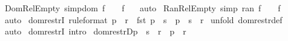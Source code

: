 \begin{isabellebody}
\isamarkupfalse%
%
\endisatagproof
{\isafoldproof}%
%
\isadelimproof
\isanewline
%
\endisadelimproof
\isanewline
\isanewline
\isanewline
{}\isamarkupfalse%
\ Dom{\isacharunderscore}Rel{\isacharunderscore}Empty\ {\isacharbrackleft}simp{\isacharbrackright}{\isacharcolon}{\isachardoublequoteopen}{\isacharparenleft}dom\ f\ {\isacharequal}\ {\isacharbraceleft}{\isacharbraceright}{\isacharparenright}\ {\isacharequal}\ {\isacharparenleft}f\ {\isacharequal}\ {\isacharbraceleft}{\isacharbraceright}{\isacharparenright}{\isachardoublequoteclose}\isanewline
%
\isadelimproof
%
\endisadelimproof
%
\isatagproof
{}\isamarkupfalse%
\ auto\isanewline
{}\isamarkupfalse%
%
\endisatagproof
{\isafoldproof}%
%
\isadelimproof
\isanewline
%
\endisadelimproof
\isanewline
{}\isamarkupfalse%
\ Ran{\isacharunderscore}Rel{\isacharunderscore}Empty\ {\isacharbrackleft}simp{\isacharbrackright}{\isacharcolon}\ {\isachardoublequoteopen}{\isacharparenleft}ran\ f\ {\isacharequal}\ {\isacharbraceleft}{\isacharbraceright}{\isacharparenright}\ {\isacharequal}\ {\isacharparenleft}f\ {\isacharequal}\ {\isacharbraceleft}{\isacharbraceright}{\isacharparenright}{\isachardoublequoteclose}\isanewline
%
\isadelimproof
%
\endisadelimproof
%
\isatagproof
{}\isamarkupfalse%
\ auto\isanewline
{}\isamarkupfalse%
%
\endisatagproof
{\isafoldproof}%
%
\isadelimproof
%
\endisadelimproof
%
\isamarkuptrue%
\isamarkupfalse%
\ dom{\isacharunderscore}restrI\ {\isacharbrackleft}rule{\isacharunderscore}format{\isacharbrackright}{\isacharcolon}\ {\isachardoublequoteopen}p\ {\isacharcolon}\ r\ {\isacharminus}{\isacharminus}{\isachargreater}\ fst\ p\ {\isacharcolon}\ s\ {\isacharminus}{\isacharminus}{\isachargreater}\ p\ {\isacharcolon}\ {\isacharparenleft}s\ {\isacharless}{\isacharcolon}\ r{\isacharparenright}{\isachardoublequoteclose}\isanewline
%
\isadelimproof
%
\endisadelimproof
%
\isatagproof
{}\isamarkupfalse%
\ {\isacharparenleft}unfold\ dom{\isacharunderscore}restr{\isacharunderscore}def{\isacharparenright}\isanewline
{}\isamarkupfalse%
\ auto\isanewline
{}\isamarkupfalse%
%
\endisatagproof
{\isafoldproof}%
%
\isadelimproof
\isanewline
%
\endisadelimproof
{}\isamarkupfalse%
\ dom{\isacharunderscore}restrI\ {\isacharbrackleft}intro{\isacharbang}{\isacharbrackright}\isanewline
\isanewline
{}\isamarkupfalse%
\ dom{\isacharunderscore}restrD{}{\isacharcolon}{\isachardoublequoteopen}p\ {\isacharcolon}\ {\isacharparenleft}s\ {\isacharless}{\isacharcolon}\ r{\isacharparenright}\ {\isacharequal}{\isacharequal}{\isachargreater}\ p\ {\isacharcolon}\ r{\isachardoublequoteclose}\isanewline

\end{isabellebody}
